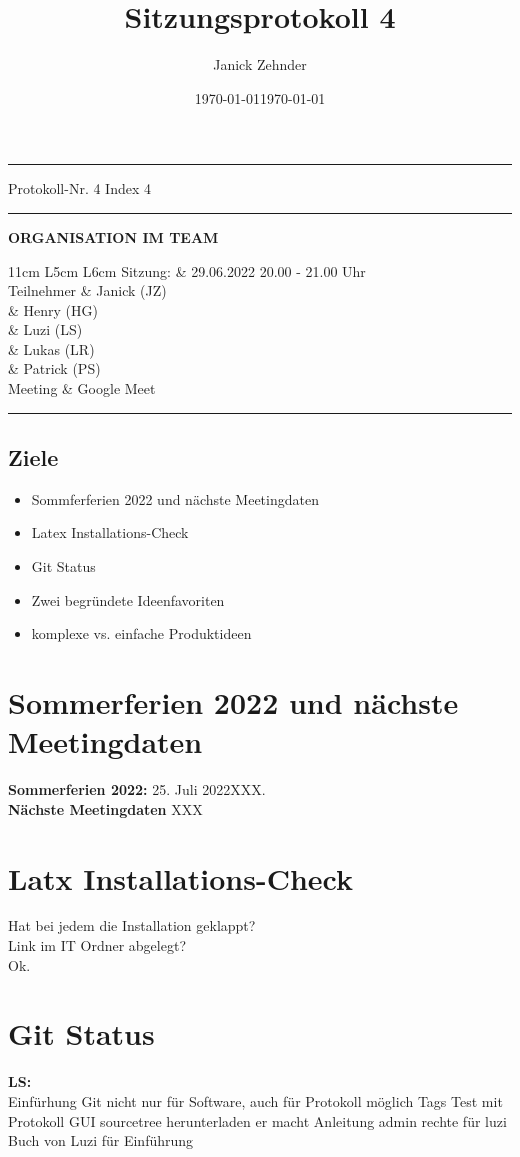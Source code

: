 \documentclass[10pt]{extarticle}
\date{}
\date{\today}
\makeatletter
\renewenvironment{abstract}
 {\par\noindent\ignorespaces}
 {\par\medskip}
\renewcommand{\maketitle}{\setlength{\parindent}{0pt}
\begin{flushleft}
  \huge\@title
  \par\vspace{1cm}
  \normalsize\@author
  \vspace{1cm}  
  
  \hrule
  \begin{minipage}[t]{\textwidth}
    \begin{minipage}[t]{0.25\textwidth}
    \vspace{0.3cm}
	Protokoll-Nr. 4 
	Index 4
    \vspace{0.3cm}
	\hrule
	\vspace{0.3cm}
	\date{\today}
	\vspace{0.3cm}
	\end{minipage}
	\begin{minipage}[t]{0.05\textwidth}
	 \hfill
	\end{minipage}
	\begin{minipage}[t]{0.70\textwidth}
	\begin{flushleft}    
	\vspace{0.3cm}
	\textbf{ORGANISATION IM TEAM}
	\vspace{0.3cm}
	
\begin{tabularx}{11cm} { 
   L{5cm}
   L{6cm}
  }
 \toprule
 Sitzung: & 29.06.2022 20.00 - 21.00 Uhr\\
 Teilnehmer & Janick (JZ) \\
 			& Henry (HG) \\
 			& Luzi (LS) \\
 			& Lukas (LR) \\
            & Patrick (PS)\\
 Meeting & Google Meet \\
 \end{tabularx}	
\begin{abstract}
\end{abstract}
\end{flushleft}
    \vspace{0.3cm}
	\end{minipage}
  \end{minipage}
  
  \hrule
\end{flushleft}
\vspace{1cm}

}
\makeatother
\begin{document}
\title{Sitzungsprotokoll 4}
\author{Janick Zehnder}
\maketitle


\colorbox{light-gray}{\begin{minipage}{17cm}
\vspace{0.25cm}
\section*{Ziele}
\begin{itemize}
\item Sommferferien 2022 und nächste Meetingdaten
\item Latex Installations-Check
\item Git Status
\item Zwei begründete Ideenfavoriten
\item komplexe vs. einfache Produktideen
\end{itemize}
\vspace{0.25cm}
\end{minipage}}



\section{Sommerferien 2022 und nächste Meetingdaten}
\textbf{Sommerferien 2022:} 25. Juli 2022XXX.\\
\textbf{Nächste Meetingdaten} XXX\\

\section{Latx Installations-Check}
Hat bei jedem die Installation geklappt?\\
Link im IT Ordner abgelegt?\\ Ok.

\section{Git Status}
\textbf{LS:}\\
Einfürhung Git
nicht nur für Software, auch für Protokoll möglich
Tags
Test mit Protokoll
GUI sourcetree herunterladen
er macht Anleitung
admin rechte für luzi
Buch von Luzi für Einführung
\end{document}
